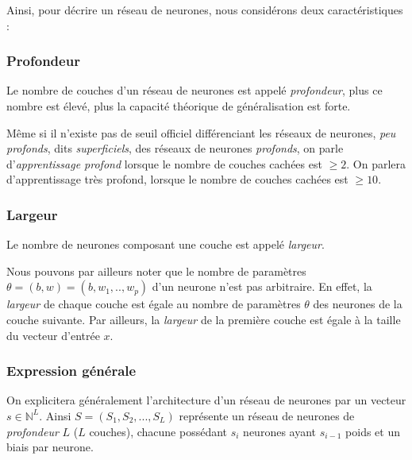 \documentclass[a4paper, 10pt]{report}
\begin{document}
Ainsi, pour décrire un réseau de neurones, nous considérons deux caractéristiques :
\subsubsection{Profondeur}
\begin{center}
	Le nombre de couches d'un réseau de neurones est appelé \emph{profondeur}, plus ce nombre est élevé, plus la capacité théorique de généralisation est forte.
\end{center}
Même si il n'existe pas de seuil officiel différenciant les réseaux de neurones, \emph{peu profonds}, dits \emph{superficiels}, des réseaux de neurones \emph{profonds}, on parle d'\emph{apprentissage profond} lorsque le nombre de couches cachées est $\geq 2$.
On parlera d'apprentissage très profond, lorsque le nombre de couches cachées est $\geq 10$.
\subsubsection{Largeur}
\begin{center}
	Le nombre de neurones composant une couche est appelé \emph{largeur}.
	\end{center}
Nous pouvons par ailleurs noter que le nombre de paramètres $\theta = (b,w) = (b,w_1,..,w_p)$ d'un neurone n'est pas arbitraire.
En effet, la \emph{largeur} de chaque couche est égale au nombre de paramètres $\theta$ des neurones de la couche suivante.
Par ailleurs, la \emph{largeur} de la première couche est égale à la taille du vecteur d'entrée $x$.
\subsubsection{Expression générale}
On explicitera généralement l'architecture d'un réseau de neurones par un vecteur $s \in \mathbb{N}^L$.
Ainsi $S = (S_1, S_2, ..., S_L)$ représente un réseau de neurones de \emph{profondeur} $L$ ($L$ couches), chacune possédant $s_i$ neurones ayant $s_{i-1}$ poids et un biais par neurone.
\end{document}
